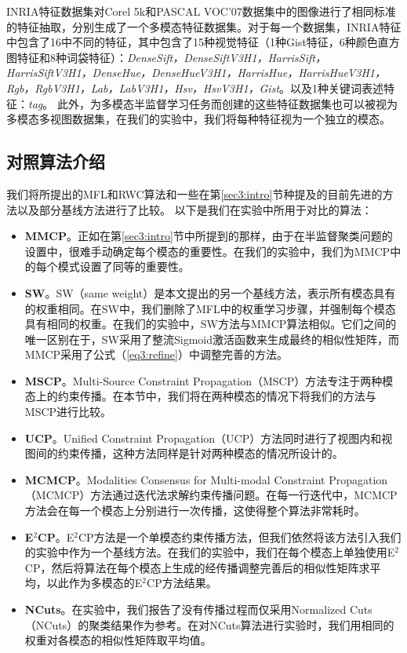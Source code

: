 INRIA特征数据集\cite{guillaumin2009tagprop}对Corel 5k和PASCAL VOC'07数据集中的图像进行了相同标准的特征抽取，分别生成了一个多模态特征数据集。对于每一个数据集，INRIA特征中包含了16中不同的特征，其中包含了15种视觉特征（1种Gist特征，6种颜色直方图特征和8种词袋特征）：\textit{DenseSift，DenseSiftV3H1，HarrisSift，HarrisSiftV3H1，DenseHue，DenseHueV3H1，HarrisHue，HarrisHueV3H1，Rgb，RgbV3H1，Lab，LabV3H1，Hsv，HsvV3H1，Gist}。以及1种关键词表述特征：\textit{tag}。
此外，为多模态半监督学习任务而创建的这些特征数据集也可以被视为多模态多视图数据集，在我们的实验中，我们将每种特征视为一个独立的模态。

\subsection{对照算法介绍}
我们将所提出的MFL和RWC算法和一些在第\ref{sec3:intro}节种提及的目前先进的方法以及部分基线方法进行了比较。
以下是我们在实验中所用于对比的算法：
\begin{itemize}
    \item {\textbf{MMCP}}。正如在第\ref{sec3:intro}节中所提到的那样，由于在半监督聚类问题的设置中，很难手动确定每个模态的重要性。在我们的实验中，我们为MMCP\cite{fu2011multi}中的每个模式设置了同等的重要性。
    \item {\textbf{SW}}。SW（same weight）是本文提出的另一个基线方法，表示所有模态具有的权重相同。在SW中，我们删除了MFL中的权重学习步骤，并强制每个模态具有相同的权重。在我们的实验中，SW方法与MMCP算法相似。它们之间的唯一区别在于，SW采用了整流Sigmoid激活函数来生成最终的相似性矩阵，而MMCP采用了公式（\ref{eq3:refine}）中调整完善的方法。
    \item {\textbf{MSCP}}。Multi-Source Constraint Propagation（MSCP）\cite{lu2013exhaustive}方法专注于两种模态上的约束传播。在本节中，我们将在两种模态的情况下将我们的方法与MSCP进行比较。
    \item {\textbf{UCP}}。Unified Constraint Propagation（UCP）\cite{lu2013unified}方法同时进行了视图内和视图间的约束传播，这种方法同样是针对两种模态的情况所设计的。
    \item {\textbf{MCMCP}}。Modalities Consensus for Multi-modal Constraint Propagation（MCMCP）\cite{fu2012modalities}方法通过迭代法求解约束传播问题。在每一行迭代中，MCMCP方法会在每一个模态上分别进行一次传播，这使得整个算法非常耗时。
    \item {\textbf{E$^2$CP}}。E$^2$CP\cite{lu2010constrained}方法是一个单模态约束传播方法，但我们依然将该方法引入我们的实验中作为一个基线方法。在我们的实验中，我们在每个模态上单独使用E$^2$CP，然后将算法在每个模态上生成的经传播调整完善后的相似性矩阵求平均，以此作为多模态的E$^2$CP方法结果。
    \item {\textbf{NCuts}}。在实验中，我们报告了没有传播过程而仅采用Normalized Cuts（NCuts）\cite{shi2000normalized}的聚类结果作为参考。在对NCuts算法进行实验时，我们用相同的权重对各模态的相似性矩阵取平均值。
\end{itemize}

